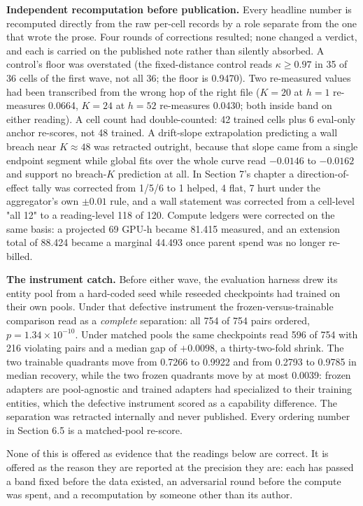 \textbf{Independent recomputation before publication.} Every headline number
is recomputed directly from the raw per-cell records by a role separate
from the one that wrote the prose. Four rounds of corrections resulted;
none changed a verdict, and each is carried on the published note rather
than silently absorbed. A control's floor was overstated (the
fixed-distance control reads $\kappa \geq 0.97$ in 35 of 36 cells of the
first wave, not all 36; the floor is 0.9470). Two re-measured values had
been transcribed from the wrong hop of the right file
($K{=}20$ at $h{=}1$ re-measures 0.0664, $K{=}24$ at $h{=}52$
re-measures 0.0430; both inside band on either reading). A cell count
had double-counted: 42 trained cells plus 6 eval-only anchor re-scores,
not 48 trained. A drift-slope extrapolation predicting a wall breach
near $K \approx 48$ was retracted outright, because that slope came from
a single endpoint segment while global fits over the whole curve read
$-0.0146$ to $-0.0162$ and support no breach-$K$ prediction at all. In
Section 7's chapter a direction-of-effect tally was corrected from 1/5/6
to 1 helped, 4 flat, 7 hurt under the aggregator's own $\pm 0.01$ rule,
and a wall statement was corrected from a cell-level "all 12" to a
reading-level 118 of 120. Compute ledgers were corrected on the same
basis: a projected 69 GPU-h became 81.415 measured, and an extension
total of 88.424 became a marginal 44.493 once parent spend was no longer
re-billed.

\textbf{The instrument catch.} Before either wave, the evaluation harness
drew its entity pool from a hard-coded seed while reseeded checkpoints
had trained on their own pools. Under that defective instrument the
frozen-versus-trainable comparison read as a \emph{complete} separation: all
754 of 754 pairs ordered, $p = 1.34 \times 10^{-10}$. Under matched
pools the same checkpoints read 596 of 754 with 216 violating pairs and
a median gap of $+0.0098$, a thirty-two-fold shrink. The two trainable
quadrants move from 0.7266 to 0.9922 and from 0.2793 to 0.9785 in median
recovery, while the two frozen quadrants move by at most 0.0039: frozen
adapters are pool-agnostic and trained adapters had specialized to their
training entities, which the defective instrument scored as a capability
difference. The separation was retracted internally and never published.
Every ordering number in Section 6.5 is a matched-pool re-score.

None of this is offered as evidence that the readings below are correct.
It is offered as the reason they are reported at the precision they are:
each has passed a band fixed before the data existed, an adversarial
round before the compute was spent, and a recomputation by someone other
than its author.

